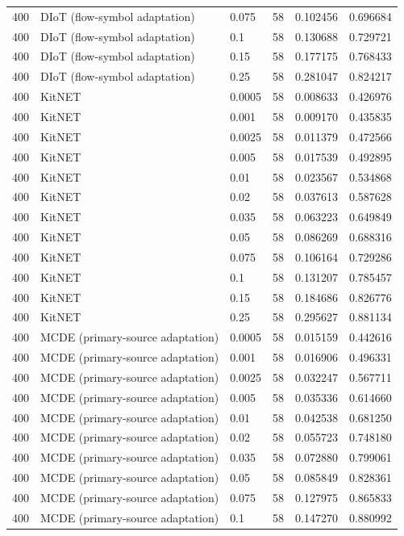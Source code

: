 \begin{tabular}{llllll}
400 & DIoT (flow-symbol adaptation) & 0.075 & 58 & 0.102456 & 0.696684 \\
400 & DIoT (flow-symbol adaptation) & 0.1 & 58 & 0.130688 & 0.729721 \\
400 & DIoT (flow-symbol adaptation) & 0.15 & 58 & 0.177175 & 0.768433 \\
400 & DIoT (flow-symbol adaptation) & 0.25 & 58 & 0.281047 & 0.824217 \\
400 & KitNET & 0.0005 & 58 & 0.008633 & 0.426976 \\
400 & KitNET & 0.001 & 58 & 0.009170 & 0.435835 \\
400 & KitNET & 0.0025 & 58 & 0.011379 & 0.472566 \\
400 & KitNET & 0.005 & 58 & 0.017539 & 0.492895 \\
400 & KitNET & 0.01 & 58 & 0.023567 & 0.534868 \\
400 & KitNET & 0.02 & 58 & 0.037613 & 0.587628 \\
400 & KitNET & 0.035 & 58 & 0.063223 & 0.649849 \\
400 & KitNET & 0.05 & 58 & 0.086269 & 0.688316 \\
400 & KitNET & 0.075 & 58 & 0.106164 & 0.729286 \\
400 & KitNET & 0.1 & 58 & 0.131207 & 0.785457 \\
400 & KitNET & 0.15 & 58 & 0.184686 & 0.826776 \\
400 & KitNET & 0.25 & 58 & 0.295627 & 0.881134 \\
400 & MCDE (primary-source adaptation) & 0.0005 & 58 & 0.015159 & 0.442616 \\
400 & MCDE (primary-source adaptation) & 0.001 & 58 & 0.016906 & 0.496331 \\
400 & MCDE (primary-source adaptation) & 0.0025 & 58 & 0.032247 & 0.567711 \\
400 & MCDE (primary-source adaptation) & 0.005 & 58 & 0.035336 & 0.614660 \\
400 & MCDE (primary-source adaptation) & 0.01 & 58 & 0.042538 & 0.681250 \\
400 & MCDE (primary-source adaptation) & 0.02 & 58 & 0.055723 & 0.748180 \\
400 & MCDE (primary-source adaptation) & 0.035 & 58 & 0.072880 & 0.799061 \\
400 & MCDE (primary-source adaptation) & 0.05 & 58 & 0.085849 & 0.828361 \\
400 & MCDE (primary-source adaptation) & 0.075 & 58 & 0.127975 & 0.865833 \\
400 & MCDE (primary-source adaptation) & 0.1 & 58 & 0.147270 & 0.880992 \\

\end{tabular}
